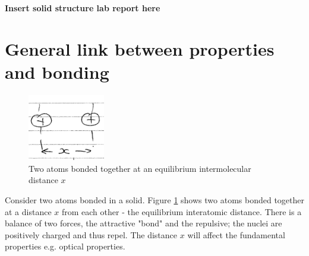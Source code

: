 \documentclass[class=report, crop=false, 12pt,a4paper]{standalone}
\begin{document}
\textbf{Insert solid structure lab report here}
\section{General link between properties and bonding}
\begin{figure}[h!]
  \centering
  \includegraphics[width=0.3\textwidth]{../img/2atomsbonded}\caption{Two atoms bonded together at an equilibrium intermolecular distance $x$}
  \label{2atomsbonded}
\end{figure}
Consider two atoms bonded in a solid. Figure \ref{2atomsbonded} shows two atoms bonded together at a distance $x$ from each other - the equilibrium interatomic distance. There is a balance of two forces, the attractive "bond" and the repulsive; the nuclei are positively charged and thus repel. The distance $x$ will affect the fundamental properties e.g. optical properties.
\end{document}
